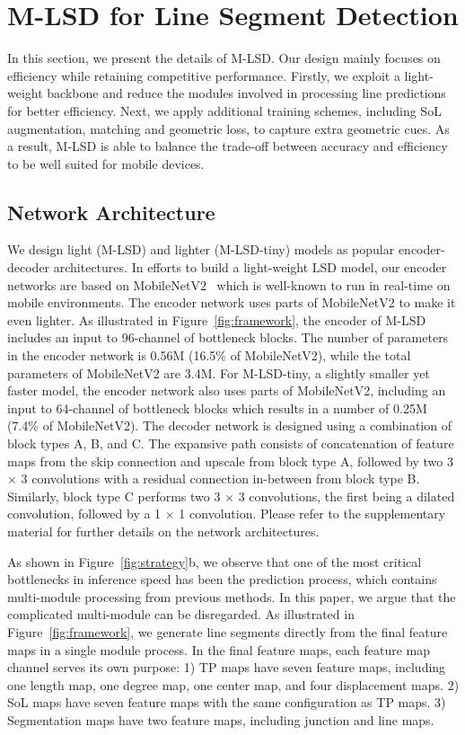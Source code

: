 \documentclass[letterpaper]{article} \usepackage{aaai22}  \usepackage{times}  \usepackage{helvet}  \usepackage{courier}  \usepackage[hyphens]{url}  \usepackage{graphicx} \urlstyle{rm} \def\UrlFont{\rm}  \usepackage{natbib}  \usepackage{caption} \DeclareCaptionStyle{ruled}{labelfont=normalfont,labelsep=colon,strut=off} \frenchspacing  \setlength{\pdfpagewidth}{8.5in}  \setlength{\pdfpageheight}{11in}  \usepackage{algorithm}
\begin{document}
\section{M-LSD for Line Segment Detection}
In this section, we present the details of M-LSD.
Our design mainly focuses on efficiency while retaining competitive performance.
Firstly, we exploit a light-weight backbone and reduce the modules involved in processing line predictions for better efficiency.
Next, we apply additional training schemes, including SoL augmentation, matching and geometric loss, to capture extra geometric cues.
As a result, M-LSD is able to balance the trade-off between accuracy and efficiency to be well suited for mobile devices.

\subsection{Network Architecture}

We design light (M-LSD) and lighter (M-LSD-tiny) models as popular encoder-decoder architectures.
In efforts to build a light-weight LSD model, our encoder networks are based on MobileNetV2~\cite{sandler2018mobilenetv2} which is well-known to run in real-time on mobile environments.
The encoder network uses parts of MobileNetV2 to make it even lighter.
As illustrated in Figure~\ref{fig:framework}, the encoder of M-LSD includes an input to 96-channel of bottleneck blocks.
The number of parameters in the encoder network is 0.56M (16.5\% of MobileNetV2), while the total parameters of MobileNetV2 are 3.4M.
For M-LSD-tiny, a slightly smaller yet faster model, the encoder network also uses parts of MobileNetV2, including an input to 64-channel of bottleneck blocks which results in a number of 0.25M (7.4\% of MobileNetV2).
The decoder network is designed using a combination of block types A, B, and C.
The expansive path consists of concatenation of feature maps from the skip connection and upscale from block type A, followed by two 3 $\times$ 3 convolutions with a residual connection in-between from block type B.
Similarly, block type C performs two 3 $\times$ 3 convolutions, the first being a dilated convolution, followed by a 1 $\times$ 1 convolution.
Please refer to the supplementary material for further details on the network architectures.

As shown in Figure~\ref{fig:strategy}b, we observe that one of the most critical bottlenecks in inference speed has been the prediction process, which contains multi-module processing from previous methods.
In this paper, we argue that the complicated multi-module can be disregarded.
As illustrated in Figure~\ref{fig:framework}, we generate line segments directly from the final feature maps in a single module process.
In the final feature maps, each feature map channel serves its own purpose:
1) TP maps have seven feature maps, including one length map, one degree map, one center map, and four displacement maps.
2) SoL maps have seven feature maps with the same configuration as TP maps.
3) Segmentation maps have two feature maps, including junction and line maps.
\end{document}
